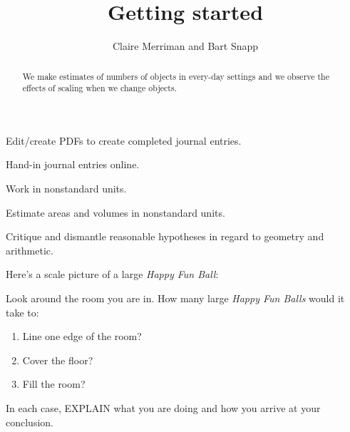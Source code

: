 \documentclass[handout,noauthor,nooutcomes,hints,12pt]{ximera}
\title{Getting started}
\author{Claire Merriman and Bart Snapp}
\begin{document}
\begin{abstract}
  We make estimates of numbers of objects in every-day settings and we
  observe the effects of scaling when we change objects.
\end{abstract}
\maketitle


\begin{listOutcomes}
  \item{Edit/create PDFs to create completed journal entries.}
  \item{Hand-in journal entries online.}
  \item{Work in nonstandard units.}
  \item{Estimate areas and volumes in nonstandard units.}
  \item{Critique and dismantle reasonable hypotheses in regard to geometry and
              arithmetic.}
\end{listOutcomes}

\mynewpage

\begin{question}
  Here's a scale picture of a large \textit{Happy Fun Ball}:
  \begin{center}
  \end{center}
  Look around the room you are in. How many large \textit{Happy Fun Balls}
  would it take to:
  \begin{enumerate}
    \item Line one edge of the room?
    \item Cover the floor?
    \item Fill the room?
  \end{enumerate}
  In each case, EXPLAIN what you are doing and how you arrive at your conclusion.
\end{question}
\mynewpage
\end{document}
